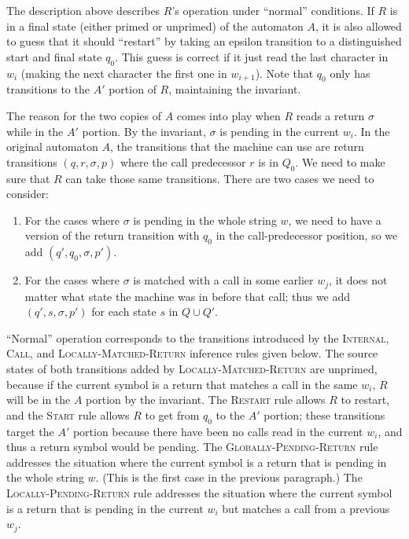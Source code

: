 The description above describes $R$'s operation under ``normal''
conditions. If $R$ is in a final state (either primed or unprimed) of the
automaton $A$, it is also allowed to guess that it should ``restart'' by taking
an epsilon transition to a distinguished start and final state $q_0$. This
guess is correct if it just read the
last character in $w_i$ (making the next character the first one in
$w_{i+1}$). Note that $q_0$ only has transitions to
the $A'$ portion of $R$, maintaining the invariant.

The reason for the two copies of $A$ comes into play when $R$ reads a return
$\sigma$ while in the $A'$ portion. By the invariant, $\sigma$ is pending in the
current $w_i$. In the original automaton $A$, the transitions that the
machine can use are return transitions $(q,r,\sigma,p)$ where the call predecessor
$r$ is in $Q_0$. We need to make sure that $R$ can take those same
transitions. There are two cases we need to consider:
\begin{enumerate}
\item For the cases where
$\sigma$ is pending in the whole string $w$, we need to have a version of the
return transition with $q_0$ in the call-predecessor position, so we add $(q',
q_0, \sigma, p')$.
\item For the cases where $\sigma$ is matched with a call in some
earlier $w_j$, it does not matter what state the machine was in before that
call; thus we add $(q', s, \sigma, p')$ for each state $s$ in $Q \cup Q'$.
\end{enumerate}
\vspace{0.25\baselineskip}

``Normal'' operation corresponds to the transitions introduced by the
\textsc{Internal}, \textsc{Call}, and \textsc{Locally-Matched-Return}
inference rules given below. The source states of both transitions added by
\textsc{Locally-Matched-Return} are unprimed, because if the current symbol
is a return that matches a call in the same $w_i$, $R$ will be in
the $A$ portion by the invariant.
The \textsc{Restart} rule allows $R$ to restart, and the
\textsc{Start} rule allows $R$ to get from $q_0$ to the $A'$ portion; these
transitions target the $A'$ portion because there have been no calls read in
the current $w_i$, and thus a return symbol would be pending.
The \textsc{Globally-Pending-Return} rule addresses the situation where the
current symbol is a return that is pending in the whole string $w$. (This is
the first case in the previous paragraph.) The \textsc{Locally-Pending-Return} rule
addresses the situation where the current symbol is a return that is pending
in the current $w_i$ but matches a call from a previous $w_j$.


